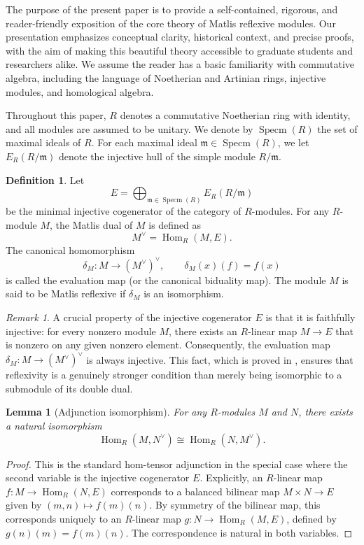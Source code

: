 \documentclass{kms-c}
\theoremstyle{plain}
\newtheorem{lemma}[theorem]{Lemma}
\theoremstyle{definition}
\newtheorem*{definition}{Definition}
\theoremstyle{remark}
\newtheorem{remark}[theorem]{Remark}
\begin{document}
The purpose of the present paper is to provide a self-contained, rigorous, and reader-friendly exposition of the core theory of Matlis reflexive modules. Our presentation emphasizes conceptual clarity, historical context, and precise proofs, with the aim of making this beautiful theory accessible to graduate students and researchers alike. We assume the reader has a basic familiarity with commutative algebra, including the language of Noetherian and Artinian rings, injective modules, and homological algebra.

Throughout this paper, \( R \) denotes a commutative Noetherian ring with identity, and all modules are assumed to be unitary. We denote by \( \operatorname{Specm}(R) \) the set of maximal ideals of \( R \). For each maximal ideal \( \mathfrak{m} \in \operatorname{Specm}(R) \), we let \( E_R(R/\mathfrak{m}) \) denote the injective hull of the simple module \( R/\mathfrak{m} \).

\begin{definition}
\label{def:duality}
Let 
\[
E = \bigoplus_{\mathfrak{m} \in \operatorname{Specm}(R)} E_R(R/\mathfrak{m})
\]
be the minimal injective cogenerator of the category of \( R \)-modules. For any \( R \)-module \( M \), the {Matlis dual} of \( M \) is defined as
\[
M^\vee = \operatorname{Hom}_R(M, E).
\]
The canonical homomorphism
\[
\delta_M : M \longrightarrow (M^\vee)^\vee, \qquad \delta_M(x)(f) = f(x)
\]
is called the {evaluation map} (or the {canonical biduality map}). The module \( M \) is said to be {Matlis reflexive} if \( \delta_M \) is an isomorphism.
\end{definition}

\begin{remark}
A crucial property of the injective cogenerator \( E \) is that it is faithfully injective: for every nonzero module \( M \), there exists an \( R \)-linear map \( M \to E \) that is nonzero on any given nonzero element. Consequently, the evaluation map \( \delta_M : M \to (M^\vee)^\vee \) is always injective. This fact, which is proved in \cite[Proposition 2.1]{Belshoff1996a}, ensures that reflexivity is a genuinely stronger condition than merely being isomorphic to a submodule of its double dual.
\end{remark}

\begin{lemma}[Adjunction isomorphism]
\label{lem:adjunction}
For any \( R \)-modules \( M \) and \( N \), there exists a natural isomorphism
\[
\operatorname{Hom}_R(M, N^\vee) \cong \operatorname{Hom}_R(N, M^\vee).
\]
\end{lemma}
\begin{proof}
This is the standard hom-tensor adjunction in the special case where the second variable is the injective cogenerator \( E \). Explicitly, an \( R \)-linear map \( f : M \to \operatorname{Hom}_R(N, E) \) corresponds to a balanced bilinear map \( M \times N \to E \) given by \( (m, n) \mapsto f(m)(n) \). By symmetry of the bilinear map, this corresponds uniquely to an \( R \)-linear map \( g : N \to \operatorname{Hom}_R(M, E) \), defined by \( g(n)(m) = f(m)(n) \). The correspondence is natural in both variables. 
\end{proof}
\end{document}
